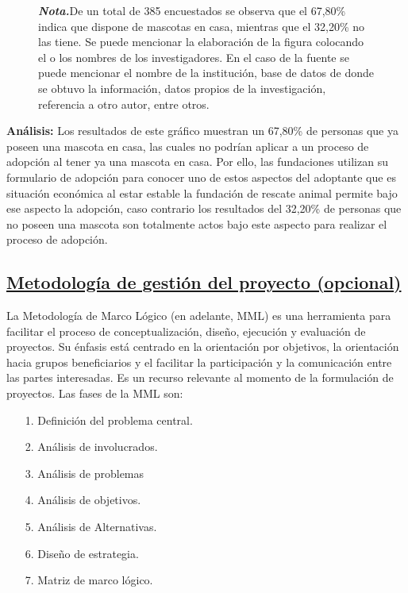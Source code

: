 \documentclass[12pt, a4paper, nofontenc, numbers=endperiod]{apa7}
\begin{document}
{\begin{figure}[h]
	\begin{tablenotes}
		{\small
			\textit{\textbf{Nota.}}De un total de 385 encuestados se observa que el 67,80\% indica que dispone de mascotas en casa, mientras que el 32,20\% no las tiene. Se puede mencionar la elaboración de la figura colocando el o los nombres de los investigadores. En el caso de la fuente se puede mencionar el nombre de la institución, base de datos de donde se obtuvo la información, datos propios de la investigación, referencia a otro autor, entre otros. \\
			
		} 
	\end{tablenotes}
\end{figure}	
\vspace*{-1cm}
\setlength{\parindent}{0cm}\textbf{Análisis: }Los resultados de este gráfico muestran un 67,80\% de personas que ya poseen una mascota en casa, las cuales no podrían aplicar a un proceso de adopción al tener ya una mascota en casa. Por ello, las fundaciones utilizan su formulario de adopción para conocer uno de estos aspectos del adoptante que es situación económica al estar estable la fundación de rescate animal permite bajo ese aspecto la adopción, caso contrario los resultados del 32,20\% de personas que no poseen una mascota son totalmente actos bajo este aspecto para realizar el proceso de adopción. 

\newpage

\subsection*{\normalsize \underline{Metodología de gestión del proyecto (opcional)}}
\setlength{\parindent}{1.27cm}La Metodología de Marco Lógico (en adelante, MML) es una herramienta para facilitar el proceso de conceptualización, diseño, ejecución y evaluación de proyectos. Su énfasis está centrado en la orientación por objetivos, la orientación hacia grupos beneficiarios y el facilitar la participación y la comunicación entre las partes interesadas. Es un recurso relevante al momento de la formulación de proyectos. Las fases de la MML son:

{\doublespacing
\begin{itemize}[leftmargin=1.70cm]
	
	\item[1.] Definición del problema central.
	\item[2.] Análisis de involucrados.
	\item[3.] Análisis de problemas
	\item[4.] Análisis de objetivos.
	\item[5.] Análisis de Alternativas.
	\item[6.] Diseño de estrategia.
	\item[7.] Matriz de marco lógico.
\end{itemize}
}

}
\end{document}
